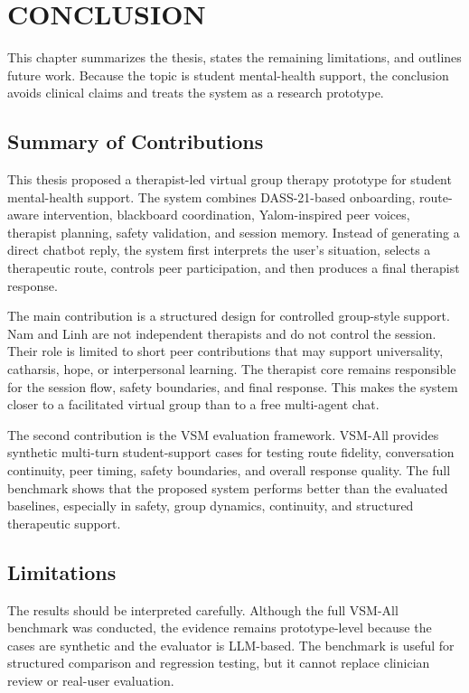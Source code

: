 \chapter{CONCLUSION}

This chapter summarizes the thesis, states the remaining limitations, and outlines future work. Because the topic is student mental-health support, the conclusion avoids clinical claims and treats the system as a research prototype.

\section{Summary of Contributions}

This thesis proposed a therapist-led virtual group therapy prototype for student mental-health support. The system combines DASS-21-based onboarding, route-aware intervention, blackboard coordination, Yalom-inspired peer voices, therapist planning, safety validation, and session memory. Instead of generating a direct chatbot reply, the system first interprets the user's situation, selects a therapeutic route, controls peer participation, and then produces a final therapist response.

The main contribution is a structured design for controlled group-style support. Nam and Linh are not independent therapists and do not control the session. Their role is limited to short peer contributions that may support universality, catharsis, hope, or interpersonal learning. The therapist core remains responsible for the session flow, safety boundaries, and final response. This makes the system closer to a facilitated virtual group than to a free multi-agent chat.

The second contribution is the VSM evaluation framework. VSM-All provides synthetic multi-turn student-support cases for testing route fidelity, conversation continuity, peer timing, safety boundaries, and overall response quality. The full benchmark shows that the proposed system performs better than the evaluated baselines, especially in safety, group dynamics, continuity, and structured therapeutic support.

\section{Limitations}

The results should be interpreted carefully. Although the full VSM-All benchmark was conducted, the evidence remains prototype-level because the cases are synthetic and the evaluator is LLM-based. The benchmark is useful for structured comparison and regression testing, but it cannot replace clinician review or real-user evaluation.

